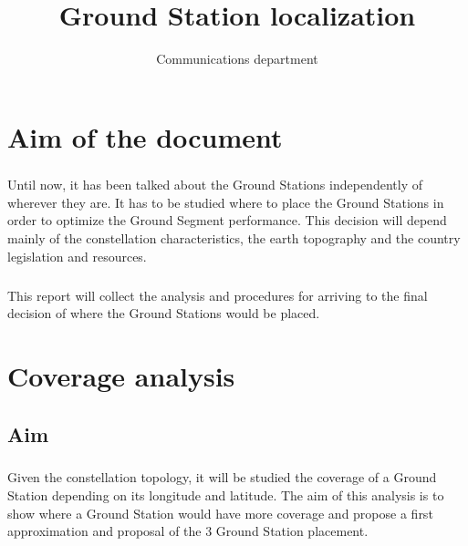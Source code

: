 \documentclass[12pt,a4paper]{report}
\author{Communications department}
\title{Ground Station localization}
\begin{document}
\maketitle
\tableofcontents
\listoffigures

\chapter*{Aim of the document}
\paragraph{}
Until now, it has been talked about the Ground Stations independently of wherever they are. It has to be studied where to place the Ground Stations in order to optimize the Ground Segment performance. This decision will depend mainly of the constellation characteristics, the earth topography and the country legislation and resources. 
\paragraph{}
This report will collect the analysis and procedures for arriving to the final decision of where the Ground Stations would be placed.

\chapter{Coverage analysis}
\section{Aim} 
\paragraph{}
Given the constellation topology, it will be studied the coverage of a Ground Station depending on its longitude and latitude. The aim of this analysis is to show where a Ground Station would have more coverage and propose a first approximation and proposal of the 3 Ground Station placement.
\end{document}
